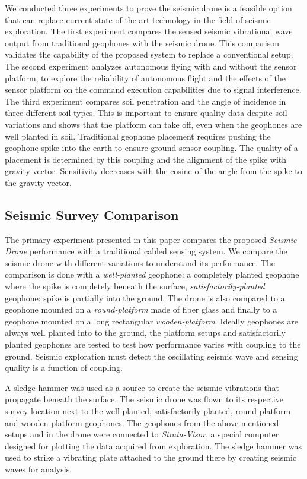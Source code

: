 We conducted three experiments to prove the seismic drone is a feasible option that can replace current state-of-the-art technology in the field of seismic exploration. The first experiment compares the sensed seismic vibrational wave output from traditional geophones with the seismic drone. This comparison validates the capability  of the proposed system to replace a conventional setup. The second experiment analyzes autonomous flying with and without the sensor platform, to explore the reliability of autonomous flight and the effects of the sensor platform on the command execution capabilities due to signal interference. The third experiment compares soil penetration and the angle of incidence in three different soil types. This is important to ensure quality data despite soil variations and shows that the platform can take off, even when the geophones are well planted in soil. Traditional geophone placement requires pushing the geophone spike into the earth to ensure ground-sensor coupling. The quality of a placement is determined by this coupling and the alignment of the spike with gravity vector. Sensitivity decreases with the cosine of the angle from the spike to the gravity vector.

\subsection{Seismic Survey Comparison}

The primary experiment presented in this paper compares the proposed \emph{Seismic Drone} performance with a traditional cabled sensing system. We compare the seismic drone with different variations to understand its performance. The comparison is done with a \emph{well-planted} geophone: a completely planted geophone where the spike is completely beneath the surface, \emph{satisfactorily-planted} geophone: spike is partially into the ground. The drone is also compared to a geophone mounted on a \emph{round-platform} made of fiber glass and finally to a geophone mounted on a long rectangular \emph{wooden-platform}. Ideally geophones are always well planted into to the ground, the platform setups and satisfactorily planted geophones are tested to test how performance varies with coupling to the ground. Seismic exploration must detect the oscillating seismic wave and sensing quality is a function of coupling. 

A sledge hammer was used as a source to create the seismic vibrations that propagate beneath the surface. The seismic drone was flown to its respective survey location next to the well planted, satisfactorily planted, round platform and wooden platform geophones. The geophones from the above mentioned setups and in the drone were connected to \emph{Strata-Visor}, a special computer designed for plotting the data acquired from exploration. The sledge hammer was used to strike a vibrating plate attached to the ground there by creating seismic waves for analysis.

